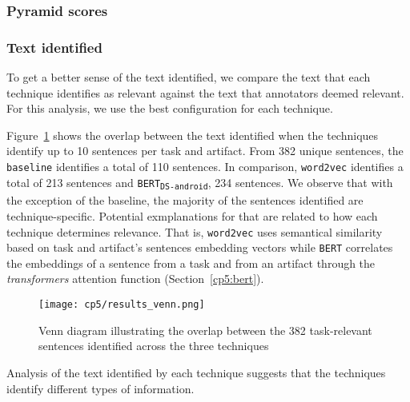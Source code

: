 \subsubsection{Pyramid scores}




\subsubsection{Text identified}


To get a better sense of the text identified, we compare the text that each technique identifies as relevant 
against the text that annotators deemed relevant. For this analysis, 
we use the best configuration for each technique. 



Figure~\ref{fig:text-overlap} shows the overlap between the text identified when the techniques identify up to 10 
sentences per task and artifact.
From 382 unique sentences, the \texttt{baseline} identifies a total of 110 sentences. In comparison, \texttt{word2vec} identifies a total of 213 sentences and \texttt{BERT\textsubscript{DS-android}}, 234 sentences. 
We observe that with the exception of the baseline, the majority of the sentences 
identified are technique-specific. Potential exmplanations for that are related to how each technique 
determines relevance. That is, \texttt{word2vec} uses semantical similarity based on task and artifact's sentences embedding vectors while 
\texttt{BERT} correlates the embeddings of a sentence from a task and from an artifact through the 
\textit{transformers} attention function (Section~\ref{cp5:bert}).




\begin{figure}
    \centering
    \texttt{[image: cp5/results\_venn.png]}
    \caption{Venn diagram illustrating the overlap between the 382 task-relevant sentences identified across the three techniques}
    \label{fig:text-overlap}
\end{figure}


Analysis of the text identified by each technique suggests that the techniques identify different types of information.











% 



